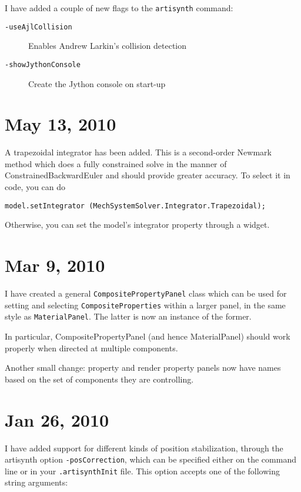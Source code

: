 \documentclass{article}
\begin{document}
I have added a couple of new flags to the {\tt artisynth} command:

\begin{description}

\item[{\tt -useAjlCollision}] \mbox{}
 Enables Andrew Larkin's collision detection

\item[{\tt -showJythonConsole}] \mbox{}
 Create the Jython console on start-up

\end{description}

\section*{May 13, 2010}

A trapezoidal integrator has been added. This is a second-order
Newmark method which does a fully constrained solve in the manner of
ConstrainedBackwardEuler and should provide greater accuracy. To
select it in code, you can do

\begin{lstlisting}[]
model.setIntegrator (MechSystemSolver.Integrator.Trapezoidal);
\end{lstlisting}

Otherwise, you can set the model's integrator property through a
widget.

\section*{Mar 9, 2010}

I have created a general {\tt CompositePropertyPanel} class which can be
used for setting and selecting {\tt CompositeProperties} within a larger
panel, in the same style as {\tt MaterialPanel}. The latter is now an
instance of the former.

In particular, CompositePropertyPanel (and hence MaterialPanel) should
work properly when directed at multiple components.

Another small change: property and render property panels now have
names based on the set of components they are controlling.

\section*{Jan 26, 2010}

I have added support for different kinds of position stabilization,
through the artisynth option {\tt -posCorrection}, which can be specified
either on the command line or in your {\tt .artisynthInit} file. This
option accepts one of the following string arguments:
\end{document}
